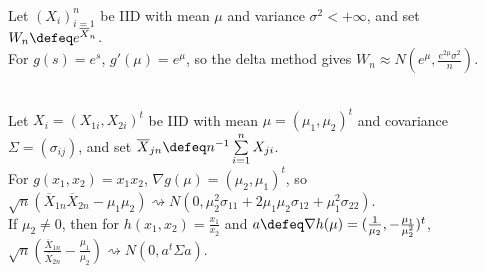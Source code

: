 \begin{example} \label{ex:delta-method-exponential-sample-mean} \\
Let $(X_i)_{i=1}^{n}$ be IID with mean $\mu$ and variance $\sigma^2<+\infty$, and set $W_n\defeq e^{\overline{X}_n}$.\\
For $g(s)=e^s$, $g'(\mu)=e^\mu$, so the delta method gives $W_n\approx N(e^\mu,\frac{e^{2\mu}\sigma^2}{n})$.
\end{example}

\begin{example} \label{ex:multivariate-delta-method-product-and-ratio} \\
Let $X_i=(X_{1i},X_{2i})^t$ be IID with mean $\mu=(\mu_1,\mu_2)^t$ and covariance $\Sigma=(\sigma_{ij})$, and set $\overline{X}_{jn}\defeq n^{-1}\sum\limits_{i=1}^{n}X_{ji}$.\\
For $g(x_1,x_2)=x_1x_2$, $\nabla g(\mu)=(\mu_2,\mu_1)^t$, so $\sqrt{n}(\overline{X}_{1n}\overline{X}_{2n}-\mu_1\mu_2)\rightsquigarrow N(0,\mu_2^2\sigma_{11}+2\mu_1\mu_2\sigma_{12}+\mu_1^2\sigma_{22})$.\\
If $\mu_2\neq0$, then for $h(x_1,x_2)=\frac{x_1}{x_2}$ and $a\defeq\nabla h(\mu)=(\frac{1}{\mu_2},-\frac{\mu_1}{\mu_2^2})^t$, $\sqrt{n}(\frac{\overline{X}_{1n}}{\overline{X}_{2n}}-\frac{\mu_1}{\mu_2})\rightsquigarrow N(0,a^t\Sigma a)$.
\end{example}
